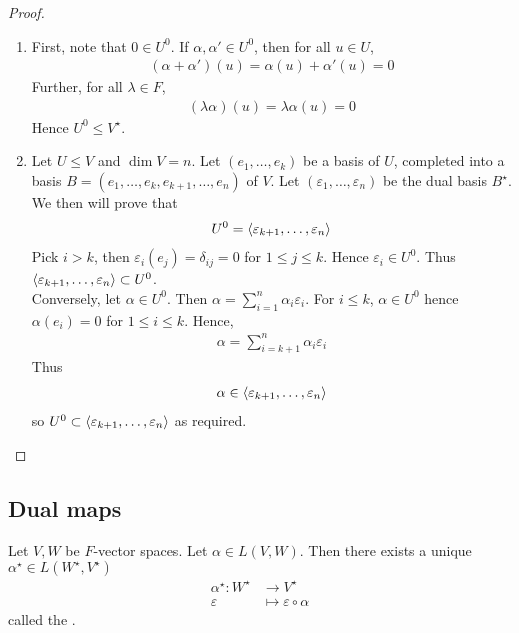 \begin{proof}
	\begin{enumerate}
		\item First, note that $0 \in U^0$.
		      If $\alpha, \alpha' \in U^0$, then for all $u \in U$,
		      \begin{align*}
			      (\alpha + \alpha')(u) = \alpha(u) + \alpha'(u) = 0
		      \end{align*}
		      Further, for all $\lambda \in F$,
		      \begin{align*}
			      (\lambda \alpha)(u) = \lambda \alpha(u) = 0
		      \end{align*}
		      Hence $U^0 \leq V^\star$.
		\item Let $U \leq V$ and $\dim V = n$. 
		Let $(e_1, \dots, e_k)$ be a basis of $U$, completed into a basis $B = (e_1, \dots, e_k, e_{k+1}, \dots, e_n)$ of $V$.
		Let $(\varepsilon_1, \dots, \varepsilon_n)$ be the dual basis $B^\star$.
		We then will prove that
		\begin{align*}
			U^0 = \langle{} \varepsilon_{k+1}, \dots, \varepsilon_n \rangle
		\end{align*}
		Pick $i > k$, then $\varepsilon_i(e_j) = \delta_{ij} = 0$ for $1 \leq j \leq k$.
		Hence $\varepsilon_i \in U^0$.
		Thus $\langle{} \varepsilon_{k+1}, \dots, \varepsilon_n \rangle \subset U^0$. \\
		Conversely, let $\alpha \in U^0$.
		Then $\alpha = \sum_{i=1}^n \alpha_i \varepsilon_i$.
		For $i \leq k$, $\alpha \in U^0$ hence $\alpha(e_i) = 0$ for $1 \leq i \leq k$.
		Hence,
		\begin{align*}
			\alpha = \sum_{i=k+1}^n \alpha_i \varepsilon_i
		\end{align*}
		Thus
		\begin{align*}
			\alpha \in \langle{} \varepsilon_{k+1}, \dots, \varepsilon_n \rangle
		\end{align*}
		so $U^0 \subset \langle{} \varepsilon_{k+1}, \dots, \varepsilon_n \rangle$ as required.
	\end{enumerate}
\end{proof}

\subsection{Dual maps}
\begin{lemma}
	Let $V, W$ be $F$-vector spaces.
	Let $\alpha \in L(V,W)$.
	Then there exists a unique $\alpha^\star \in L(W^\star, V^\star)$
	\begin{align*}
		\alpha^\star : W^\star &\to V^\star \\
		\varepsilon &\mapsto \varepsilon \circ \alpha
	\end{align*}
	called the .
\end{lemma}

